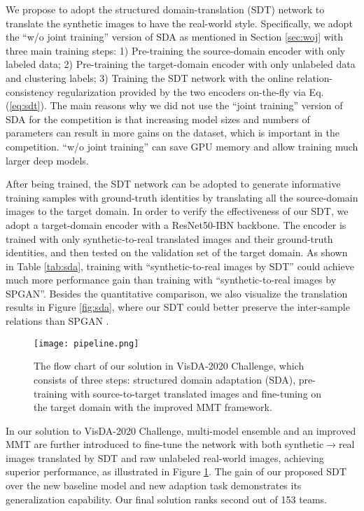 \documentclass[journal]{IEEEtran}
\begin{document}
We propose to adopt the structured domain-translation (SDT) network to translate the synthetic images to have the real-world style.
Specifically, we adopt the ``w/o joint training'' version of SDA as mentioned in Section \ref{sec:woj} with three main training steps:
1) Pre-training the source-domain encoder with only labeled data;
2) Pre-training the target-domain encoder with only unlabeled data and clustering labels;
3) Training the SDT network with the online relation-consistency regularization provided by the two encoders on-the-fly via Eq. (\ref{eq:sdt}). The main reasons why we did not use the ``joint training'' version of SDA for the competition is that increasing model sizes and numbers of parameters can result in more gains on the dataset, which is important in the competition. ``w/o joint training'' can save GPU memory and allow training much larger deep models.


After being trained, the SDT network can be adopted to generate informative training samples with ground-truth identities by translating all the source-domain images to the target domain.
In order to verify the effectiveness of our SDT, we adopt a target-domain encoder with a ResNet50-IBN backbone.
The encoder is trained with only synthetic-to-real translated images and their ground-truth identities, and then tested on the validation set of the target domain.
As shown in Table \ref{tab:sda}, training with ``synthetic-to-real images by SDT'' could achieve much more performance gain than training with ``synthetic-to-real images by SPGAN''.
Besides the quantitative comparison, we also visualize the translation results in Figure \ref{fig:sda}, where our SDT could better preserve the inter-sample relations than SPGAN \cite{deng2018image}.

\begin{figure}
    \centering
    \texttt{[image: pipeline.png]}
    \caption{{The flow chart of our solution in VisDA-2020 Challenge, which consists of three steps: structured domain adaptation (SDA), pre-training with source-to-target translated images and fine-tuning on the target domain with the improved MMT framework.}}
    \label{fig:flow}
\end{figure}

In our solution to VisDA-2020 Challenge, multi-model ensemble and an improved MMT \cite{ge2020improved,ge2020mutual} are further introduced to fine-tune the network with both synthetic$\to$real images translated by SDT and raw unlabeled real-world images, achieving superior performance, as illustrated in Figure \ref{fig:flow}. The gain of our proposed SDT over the new baseline model and new adaption task demonstrates its generalization capability.
Our final solution ranks second out of 153 teams.
\end{document}
